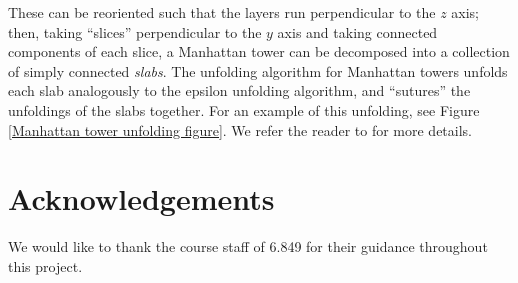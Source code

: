 \documentclass{article}
\begin{document}
These can be reoriented such that the layers run perpendicular to the $z$ axis; then, taking ``slices'' perpendicular to the $y$ axis and taking connected components of each slice, a Manhattan tower can be decomposed into a collection of simply connected \emph{slabs}.
The unfolding algorithm for Manhattan towers unfolds each slab analogously to the epsilon unfolding algorithm, and ``sutures'' the unfoldings of the slabs together.
For an example of this unfolding, see Figure \ref{Manhattan tower unfolding figure}.
We refer the reader to \cite{Damian_Flatland_Orourke_Manhattan} for more details.

\section{Acknowledgements}
We would like to thank the course staff of 6.849 for their guidance throughout this project.

\printbibliography
\end{document}
